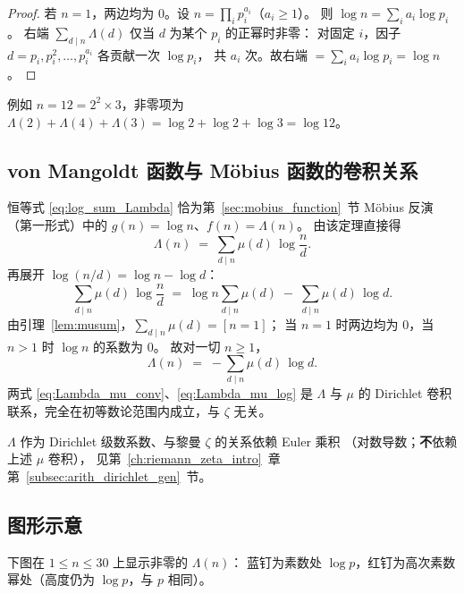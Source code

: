\begin{proof}
若 $n=1$，两边均为 $0$。设 $n=\prod_{i}p_i^{a_i}$（$a_i\ge 1$）。
则 $\log n=\sum_{i}a_i\log p_i$。
右端 $\sum_{d\mid n}\Lambda(d)$ 仅当 $d$ 为某个 $p_i$ 的正幂时非零：
对固定 $i$，因子 $d=p_i,p_i^2,\ldots,p_i^{a_i}$ 各贡献一次 $\log p_i$，
共 $a_i$ 次。故右端 $=\sum_{i}a_i\log p_i=\log n$。
\end{proof}

例如 $n=12=2^2\times 3$，非零项为 $\Lambda(2)+\Lambda(4)+\Lambda(3)
=\log 2+\log 2+\log 3=\log 12$。

\subsection{von Mangoldt 函数与 Möbius 函数的卷积关系}\label{subsec:Lambda_mu_conv}

恒等式 \eqref{eq:log_sum_Lambda} 恰为第~\ref{sec:mobius_function}~节 Möbius 反演
（第一形式）中的 $g(n)=\log n$、$f(n)=\Lambda(n)$。
由该定理直接得
\begin{equation}
\Lambda(n)
  \;=\;
  \sum_{d\mid n} \mu(d)\,\log\frac{n}{d}.
\label{eq:Lambda_mu_conv}
\end{equation}
再展开 $\log(n/d)=\log n-\log d$：
\[
\sum_{d\mid n}\mu(d)\,\log\frac{n}{d}
  \;=\;
  \log n\sum_{d\mid n}\mu(d)
  \;-\;
  \sum_{d\mid n}\mu(d)\,\log d.
\]
由引理~\ref{lem:musum}，$\sum_{d\mid n}\mu(d)=[n=1]$；
当 $n=1$ 时两边均为 $0$，当 $n>1$ 时 $\log n$ 的系数为 $0$。
故对一切 $n\ge 1$，
\begin{equation}
\Lambda(n)
  \;=\;
  -\sum_{d\mid n} \mu(d)\,\log d.
\label{eq:Lambda_mu_log}
\end{equation}
两式 \eqref{eq:Lambda_mu_conv}、\eqref{eq:Lambda_mu_log} 是 $\Lambda$ 与 $\mu$ 的
Dirichlet 卷积联系，完全在初等数论范围内成立，与 $\zeta$ 无关。

$\Lambda$ 作为 Dirichlet 级数系数、与黎曼 $\zeta$ 的关系依赖 Euler 乘积
（对数导数；\textbf{不}依赖上述 $\mu$ 卷积），
见第~\ref{ch:riemann_zeta_intro}~章第~\ref{subsec:arith_dirichlet_gen}~节。

\subsection{图形示意}

下图在 $1\le n\le 30$ 上显示非零的 $\Lambda(n)$：
蓝钉为素数处 $\log p$，红钉为高次素数幂处（高度仍为 $\log p$，与 $p$ 相同）。

